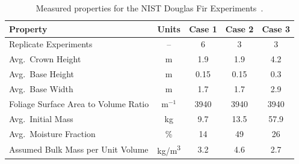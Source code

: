 \begin{table}[ht]
\centering
\caption[Measured properties for the NIST Douglas Fir Experiments]{Measured properties for the NIST Douglas Fir Experiments~\cite{Mell:2009}.}
\label{Properties_Trees}
\begin{tabular}{|l|c|c|c|c|}
\hline
Property                                & Units         & Case 1        & Case 2        & Case 3     \\ \hline \hline
Replicate Experiments                   & --            & 6             & 3             & 3          \\ \hline
Avg.~Crown Height                       & m             & 1.9           & 1.9           & 4.2        \\ \hline
Avg.~Base Height                        & m             & 0.15          & 0.15          & 0.3        \\ \hline
Avg.~Base Width                         & m             & 1.7           & 1.7           & 2.9        \\ \hline
Foliage Surface Area to Volume Ratio    & m$^{-1}$      & 3940          & 3940          & 3940       \\ \hline
Avg.~Initial Mass                       & kg            & 9.7           & 13.5          & 57.9       \\ \hline
Avg.~Moisture Fraction                  & \%            & 14            & 49            & 26         \\ \hline
Assumed Bulk Mass per Unit Volume       & \unit{kg/m^3}      & 3.2           & 4.6           & 2.7        \\ \hline
\end{tabular}
\end{table}

